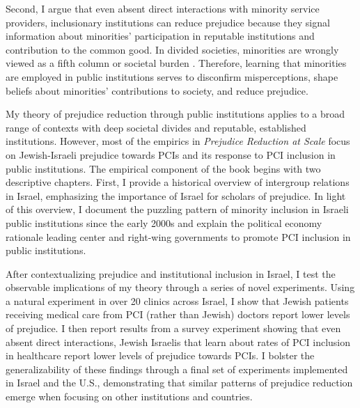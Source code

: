 \documentclass[12pt]{article}
\theoremstyle{plain}
\begin{document}
Second, I argue that even absent direct interactions with minority service providers, inclusionary institutions can reduce prejudice because they signal information about minorities' participation in reputable institutions and contribution to the common good. In divided societies, minorities are wrongly viewed as a fifth column or societal burden \citep{Bracic:2020ud,Lajevardi:2020aa}. Therefore, learning that minorities are employed in public institutions serves to disconfirm misperceptions, shape beliefs about minorities' contributions to society, and reduce prejudice.


My theory of prejudice reduction through public institutions applies to a broad range of contexts with deep societal divides and reputable, established institutions. However, most of the empirics in \emph{Prejudice Reduction at Scale} focus on Jewish-Israeli prejudice towards PCIs and its response to PCI inclusion in public institutions. The empirical component of the book begins with two descriptive chapters. First, I provide a historical overview of intergroup relations in Israel, emphasizing the importance of Israel for scholars of prejudice. In light of this overview, I document the puzzling pattern of minority inclusion in Israeli public institutions since the early 2000s and explain the political economy rationale leading center and right-wing governments to promote PCI inclusion in public institutions. 


After contextualizing prejudice and institutional inclusion in Israel, I test the observable implications of my theory through a series of novel experiments. Using a natural experiment in over 20 clinics across Israel, I show that Jewish patients receiving medical care from PCI (rather than Jewish) doctors report lower levels of prejudice. I then report results from a survey experiment showing that even absent direct interactions, Jewish Israelis that learn about rates of PCI inclusion in healthcare report lower levels of prejudice towards PCIs. I bolster the generalizability of these findings through a final set of experiments implemented in Israel and the U.S., demonstrating that similar patterns of prejudice reduction emerge when focusing on other institutions and countries. 
\end{document}
